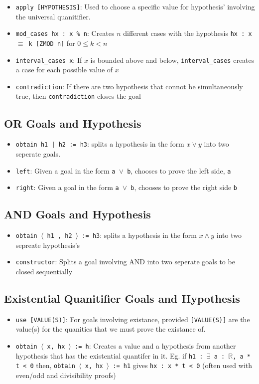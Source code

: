 \documentclass{exam}
\newcommand{\RR}{\mathbb R}
\begin{document}
\begin{itemize}
        \item \verb|apply [HYPOTHESIS]|: Used to choose a specific value for hypothesis' involving the universal quanitifier.
        \item \verb|mod_cases hx : x % n|: Creates $n$ different cases with the hypothesis \texttt{hx : x $\equiv$ k [ZMOD n]} for $0 \leq k < n$
        \item \verb|interval_cases x|: If $x$ is bounded above and below, \texttt{interval\_cases} creates a case for each possible value of $x$
        \item \verb|contradiction|: If there are two hypothesis that connot be simultaneously true, then \verb|contradiction| closes the goal
    \end{itemize}
    \subsection*{OR Goals and Hypothesis}
    \begin{itemize}
        \item \verb+obtain h1 | h2 := h3+: splits a hypothesis in the form $x \lor y$ into two seperate goals.
        \item \verb|left|: Given a goal in the form \texttt{a $\lor$ b}, chooses to prove the left side, \texttt{a}
        \item \verb|right|: Given a goal in the form \texttt{a $\lor$ b}, chooses to prove the right side \texttt{b}
    \end{itemize}
    \subsection*{AND Goals and Hypothesis}
    \begin{itemize}
        \item \texttt{obtain $\langle$ h1 , h2 $\rangle$ := h3}: splits a hypothesis in the form $x \land y$ into two sepreate hypothesis's
        \item \verb|constructor|: Splits a goal involving AND into two seperate goals to be closed sequentially
    \end{itemize}
    \subsection*{Existential Quanitifier Goals and Hypothesis}
    \begin{itemize}
        \item \verb|use [VALUE(S)]|: For goals involving existance, provided \texttt{[VALUE(S)]} are the value(s) for the quanities that we must prove the existance of.
        \item \texttt{obtain $\langle$ x, hx $\rangle$ := h}: Creates a value and a hypothesis from another hypothesis that has the existential quantifer in it. Eg. if \texttt{h1 : $\exists$ a : $\RR$, a * t < 0} then, \texttt{obtain $\langle$ x, hx $\rangle$ := h1} gives \texttt{hx : x * t < 0} (often used with even/odd and divisibility proofs)
    \end{itemize}
\end{document}
